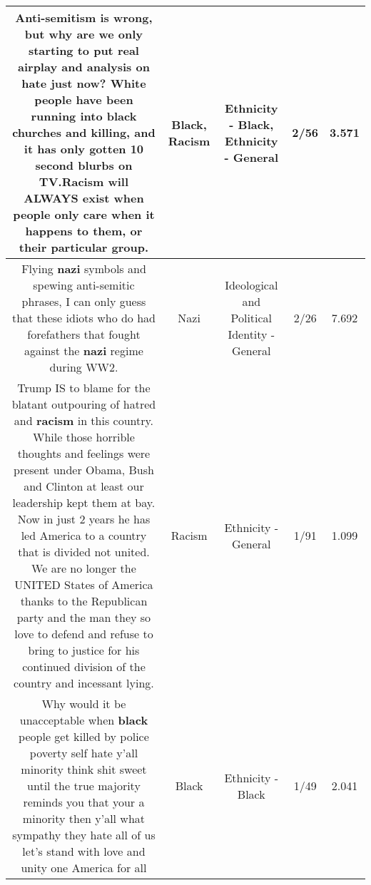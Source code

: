 \documentclass[11pt]{article}
\newlength\mylength
\begin{document}
\begin{center}
\begin{longtable}{|C{.65\mylength}|C{.30\mylength}|C{.12\mylength}|C{.12\mylength}|C{.12\mylength}|}
  \small Anti-semitism is wrong, but why are we only starting to put real airplay and analysis on hate just now? White people have been running into \textbf{black} churches and killing, and it has only gotten 10 second blurbs on TV.\textbf{Racism} will ALWAYS exist when people only care when it happens to them, or their particular group.\normalsize   & Black, Racism & Ethnicity - Black, Ethnicity - General & 2/56 & 3.571 \\  \hline
  \small Flying \textbf{nazi} symbols and spewing anti-semitic phrases,  I can only guess that these idiots who do had forefathers that fought against the \textbf{nazi} regime during WW2.\normalsize   & Nazi &  Ideological and Political Identity - General & 2/26 & 7.692 \\  \hline
  \small Trump IS to blame for the blatant outpouring of hatred and \textbf{racism} in this country.  While those horrible thoughts and feelings were present under Obama, Bush and Clinton at least our leadership kept them at bay.  Now in just 2 years he has led America to a country that is divided not united.  We are no longer the UNITED States of America thanks to the Republican party and the man they so love to defend and refuse to bring to justice for his continued division of the country and incessant lying.\normalsize   & Racism & Ethnicity - General & 1/91 & 1.099 \\  \hline
  \small Why would it be unacceptable when \textbf{black} people get killed by police poverty self hate y'all minority think  shit sweet until the true majority reminds you that your a minority then y'all what sympathy they hate all of us let's stand with love and unity one America for all\normalsize   & Black & Ethnicity - Black & 1/49 & 2.041 \\  \hline

\end{longtable}
\end{center}
\end{document}
